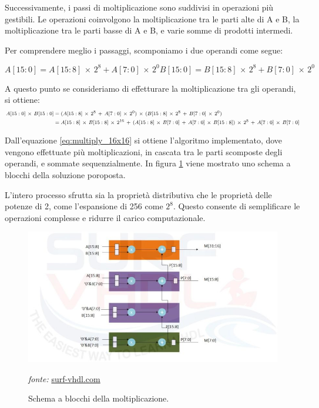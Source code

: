 \documentclass[titlepage]{report}
\begin{document}
		Successivamente, i passi di moltiplicazione sono suddivisi in operazioni più gestibili. Le operazioni coinvolgono la moltiplicazione tra le parti alte di A e B, la moltiplicazione tra le parti basse di A e B, e varie somme di prodotti intermedi.

		Per comprendere meglio i passaggi, scomponiamo i due operandi come segue:

		\begin{equation}
			A[15:0] = A[15:8]\,\times\,2^8 +A[7:0]\,\times\,2^0
			B[15:0] = B[15:8]\,\times\,2^8 +B[7:0]\,\times\,2^0	
			\label{eq:operandi}	
		\end{equation}
		
		A questo punto se consideriamo di effetturare la moltiplicazione tra gli operandi, si ottiene:
		\begin{equation}
			\footnotesize
			\label{eq:multiply_16x16}
			\begin{aligned}
				A[15:0]\,\times\,B[15:0] &= (A[15:8]\,\times\,2^8\,+\,A[7:0]\,\times\,2^0)\,\times\,(B[15:8]\,\times\,2^8\,+\,B[7:0]\,\times\,2^0) \\ 
				&= A[15:8]\,\times\,B[15:8]\,\times\,2^{16}\,+\,(A[15:8]\,\times\,B[7:0]\,+\,A[7:0]\,\times\,B[15:8])\,\times\,2^8\,+\,A[7:0]\,\times\,B[7:0]
			\end{aligned}
		\end{equation}

		Dall'equazione \ref{eq:multiply_16x16} si ottiene l'algoritmo implementato, dove vengono effettuate più moltiplicazioni, in cascata tra le parti scomposte degli operandi, e sommate sequenzialmente. In figura \ref{fig:multiplier16x16_surfvhdl} viene mostrato uno schema a blocchi della soluzione poroposta.
	
		L'intero processo sfrutta sia la proprietà distributiva che le proprietà delle potenze di 2, come l'espansione di 256 come $2^8$. Questo consente di semplificare le operazioni complesse e ridurre il carico computazionale. \par

		\begin{figure}[H]
			\centering
			\includegraphics[scale=0.8]{./img/multiplier_16x16_break.jpg}
			\caption{Schema a blocchi della moltiplicazione.}\textit{fonte:} \hyperlink{https://surf-vhdl.com}{surf-vhdl.com}
			\label{fig:multiplier16x16_surfvhdl}
		\end{figure}
\end{document}

